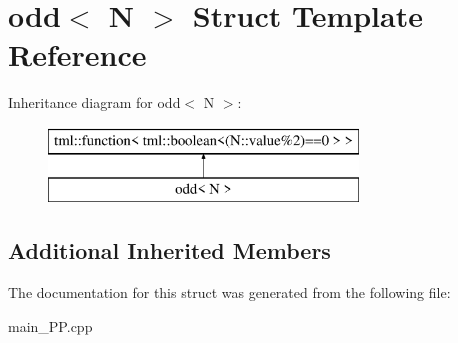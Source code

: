 \hypertarget{structodd}{\section{odd$<$ N $>$ Struct Template Reference}
\label{structodd}
}
Inheritance diagram for odd$<$ N $>$\+:\begin{figure}[H]
\begin{center}
\leavevmode
\includegraphics[height=2.000000cm]{structodd}
\end{center}
\end{figure}
\subsection*{Additional Inherited Members}


The documentation for this struct was generated from the following file\+:\begin{DoxyCompactItemize}
\item 
main\+\_\+\+P\+P.\+cpp\end{DoxyCompactItemize}
